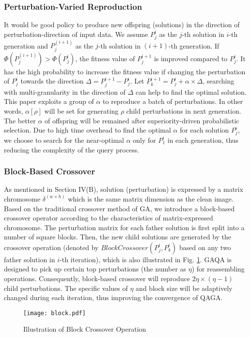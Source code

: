 \documentclass[lettersize,journal]{IEEEtran}
\begin{document}
	\subsubsection{Perturbation-Varied Reproduction}
	It would be good policy to produce new offspring (solutions) in the direction of perturbation-direction of input data. We assume $P^i_j$ as the $j$-th solution in $i$-th generation and  $P^{(i+1)}_j$ as the $j$-th solution in $(i+1)$-th generation. If $\Phi(P^{(i+1)}_j) > \Phi(P^i_j)$, the fitness value of $P^{i+1}_j$ is improved compared to $P^i_j$. It has the high probability to increase the fitness value if changing the perturbation of  $P^i_j$  towards the direction $\Delta=P^{i+1}_j-P^i_j$. Let $P^{i+1}_k = P^{i}_j + \alpha \times \Delta$, searching with multi-granularity in the direction of $\Delta$ can help to find the optimal solution. This paper exploits a group of $\alpha$ to reproduce a batch of perturbations. In other words, $\alpha[\rho]$ will be set for generating $\rho$ child perturbations in next generation. The better $\alpha$ of offspring will be remained after superiority-driven probabilistic selection. Due to high time overhead to find the optimal $\alpha$ for each solution $P^i_j$, we choose to search for the near-optimal $\alpha$ only for $P^i_{1}$ in each generation, thus reducing the complexity of the query process.
	
	
	
	\subsubsection{Block-Based Crossover}
	As mentioned in Section IV(B), solution (perturbation) is expressed by a matrix chromosome $\delta^{( w \times h)}$ which is the same matrix dimension as the clean image. Based on the traditional crossover method of GA, we introduce a block-based crossover operator according to the characteristics of matrix-expressed chromosome. The perturbation matrix for each father solution is first split into a number of square blocks. Then, the new child solutions are generated by the crossover operation (denoted by $BlockCrossover(P^i_j, P^i_k)$ based on any two father solution in $i$-th iteration), which is also illustrated in Fig. \ref{fig:block}. GAQA is designed to pick up certain top perturbations (the number as $\eta$) for reassembling operations. Consequently, block-based crossover will reproduce $2\eta\times(\eta-1)$ child perturbations. The specific values of $\eta$ and block size will be adaptively changed during each iteration, thus improving the convergence of QAGA.  
	\begin{figure}[tb]
		\centering
		\texttt{[image: block.pdf]}
		\centering \caption{Illustration of Block Crossover Operation }
		\label{fig:block}
	\end{figure}
	
\end{document}

